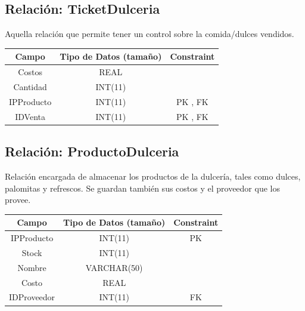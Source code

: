 \documentclass[12pt, fleqn]{report}                             %
\begin{document}
        \subsection*{Relación: TicketDulceria}

            Aquella relación que permite tener un control sobre la comida/dulces vendidos.

            \vspace{2em}

            \small{
            \begin{tabular}{| c | c | c |}
                \hline
                \textbf{Campo} & \textbf{Tipo de Datos (tamaño)} & \textbf{Constraint} \\[0.5ex] 
                \hline\hline
                
                Costos          & REAL       &                           \\
                Cantidad        & INT(11)    &                           \\
                IPProducto      & INT(11)    & PK , FK                   \\
                IDVenta         & INT(11)    & PK , FK                   \\
                \hline
            \end{tabular}
            }




        \subsection*{Relación: ProductoDulceria}

            Relación encargada de almacenar los productos de la dulcería, tales como dulces,
            palomitas y refrescos. Se guardan también sus costos y el proveedor que los provee.

            \vspace{2em}

            \small{
            \begin{tabular}{| c | c | c |}
                \hline
                \textbf{Campo} & \textbf{Tipo de Datos (tamaño)} & \textbf{Constraint} \\[0.5ex] 
                \hline\hline
                
                IPProducto      & INT(11)       & PK                    \\
                Stock           & INT(11)       &                       \\
                Nombre          & VARCHAR(50)   &                       \\
                Costo           & REAL          &                       \\
                IDProveedor     & INT(11)       & FK                    \\
                \hline
            \end{tabular}
            }
\end{document}
